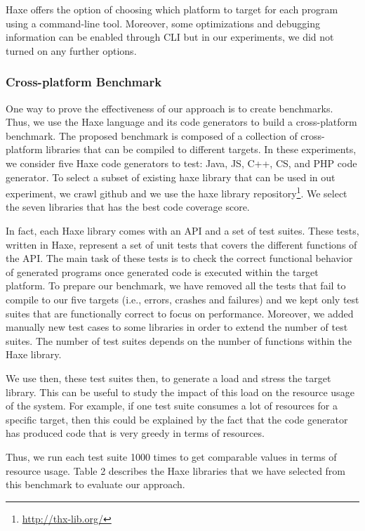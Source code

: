 Haxe offers the option of choosing which platform to target for each program using a command-line tool. Moreover, some optimizations and debugging information can be enabled through CLI but in our experiments, we did not turned on any further options. 

\subsubsection{Cross-platform Benchmark}
One way to prove the effectiveness of our approach is to create benchmarks. Thus, we use the Haxe language and its code generators to build a cross-platform benchmark. The proposed benchmark is composed of a collection of cross-platform libraries that can be compiled to different targets. In these experiments, we consider five Haxe code generators to test: Java, JS, C++, CS, and PHP code generator. To select a subset of existing haxe library that can be used in out experiment, we crawl github and we use the haxe library repository\footnote{\url{http://thx-lib.org/}}. We select the seven libraries that has the best code coverage score. 

In fact, each Haxe library comes with an API and a set of test suites. These tests, written in Haxe, represent a set of unit tests that covers the different functions of the API. The main task of these tests is to check the correct functional behavior of generated programs once generated code is executed within the target platform. To prepare our benchmark, we have removed all the tests that fail to compile to our five targets (i.e., errors, crashes and failures) and we kept only test suites that are functionally correct to focus on performance.  
Moreover, we added manually new test cases to some libraries in order to extend the number of test suites. The number of test suites depends on the number of functions within the Haxe library.



We use then, these test suites then, to generate a load and stress the target library. This can be useful to study the impact of this load on the resource usage of the system. For example, if one test suite consumes a lot of resources for a specific target, then this could be explained by the fact that the code generator has produced code that is very greedy in terms of resources.

Thus, we run each test suite 1000 times to get comparable values in terms of resource usage.
Table 2 describes the Haxe libraries that we have selected from this benchmark to evaluate our
approach.

